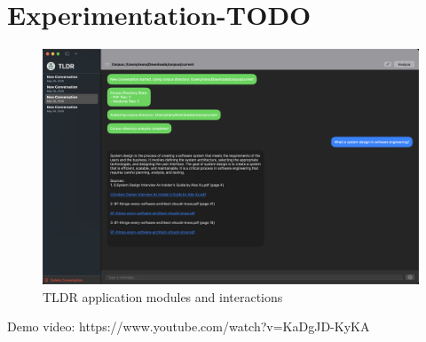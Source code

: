 
\chapter{Experimentation-TODO}
\label{ch:Experimentation}

\begin{figure}[H]
    \centering
    \includegraphics[width=1.0\linewidth]{images/tldr-ui-window.png}
    \caption{TLDR application modules and interactions }
    \label{fig:tldrmodulesinteraction}
\end{figure}

Demo video: https://www.youtube.com/watch?v=KaDgJD-KyKA
